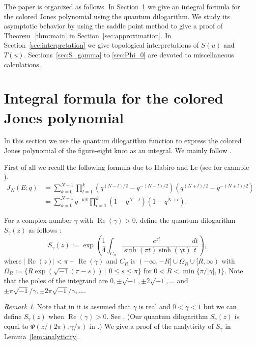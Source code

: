 \documentclass[a4paper]{amsart}
\theoremstyle{plain}
\theoremstyle{definition}
\theoremstyle{remark}
\newtheorem{rem}[thm]{Remark}
\renewcommand{\Re}{\operatorname{Re}}
\numberwithin{equation}{section}
\begin{document}
\par
The paper is organized as follows.
In Section~\ref{sec:integral} we give an integral formula for the colored Jones polynomial using the quantum dilogarithm.
We study its asymptotic behavior by using the saddle point method to give a proof of Theorem~\ref{thm:main} in Section~\ref{sec:approximation}.
In Section~\ref{sec:interpretation} we give topological interpretations of $S(u)$ and $T(u)$.
Sections~\ref{sec:S_gamma} to \ref{sec:Phi_0} are devoted to miscellaneous calculations.
\section{Integral formula for the colored Jones polynomial}
\label{sec:integral}
In this section we use the quantum dilogarithm function to express the colored Jones polynomial of the figure-eight knot as an integral.
We mainly follow \cite{Andersen/Hansen:JKNOT2006}.
\par
First of all we recall the following formula due to Habiro and Le (see for example \cite{Masbaum:ALGGT12003}).
\begin{equation}\label{eq:Habiro_Le}
\begin{split}
  J_N(E;q)
  &=
  \sum_{k=0}^{N-1}
  \prod_{l=1}^{k}
  \left(q^{(N-l)/2}-q^{-(N-l)/2}\right)
  \left(q^{(N+l)/2}-q^{-(N+l)/2}\right)
  \\
  &=
  \sum_{k=0}^{N-1}
  q^{-kN}
  \prod_{l=1}^{k}
  \left(1-q^{N-l}\right)
  \left(1-q^{N+l}\right).
\end{split}
\end{equation}
\par
For a complex number $\gamma$ with $\Re(\gamma)>0$, define the quantum dilogarithm $S_{\gamma}(z)$ as follows \cite{Faddeev:LETMP1995}:
\begin{equation*}
  S_{\gamma}(z)
  :=
  \exp
  \left(
    \frac{1}{4}
    \int_{C_R}
    \frac{e^{zt}}{\sinh(\pi t)\sinh(\gamma t)}
    \frac{dt}{t}
  \right),
\end{equation*}
where $|\Re(z)|<\pi+\Re(\gamma)$ and $C_R$ is $(-\infty,-R]\cup\Omega_R\cup[R,\infty)$ with $\Omega_R:=\{R\exp(\sqrt{-1}(\pi-s))\mid0\le s\le\pi\}$ for $0<R<\min\{\pi/|\gamma|,1\}$.
Note that the poles of the integrand are $0,\pm\sqrt{-1},\pm2\sqrt{-1},\dots$ and $\pm\pi\sqrt{-1}/\gamma,\pm2\pi\sqrt{-1}/\gamma,\dots$.
\begin{rem}
Note that in \cite{Andersen/Hansen:JKNOT2006} it is assumed that $\gamma$ is real and $0<\gamma<1$ but we can define $S_{\gamma}(z)$ when $\Re(\gamma)>0$.
See \cite[(3.21)]{Dimofte/Gukov/Lenells/Zagier:CNTP2010}.
(Our quantum dilogarithm $S_{\gamma}(z)$ is equal to $\Phi(z/(2\pi);\gamma/\pi)$ in \cite{Dimofte/Gukov/Lenells/Zagier:CNTP2010}.)
We give a proof of the analyticity of $S_{\gamma}$ in Lemma~\ref{lem:analyticity}.
\end{rem}
\end{document}
